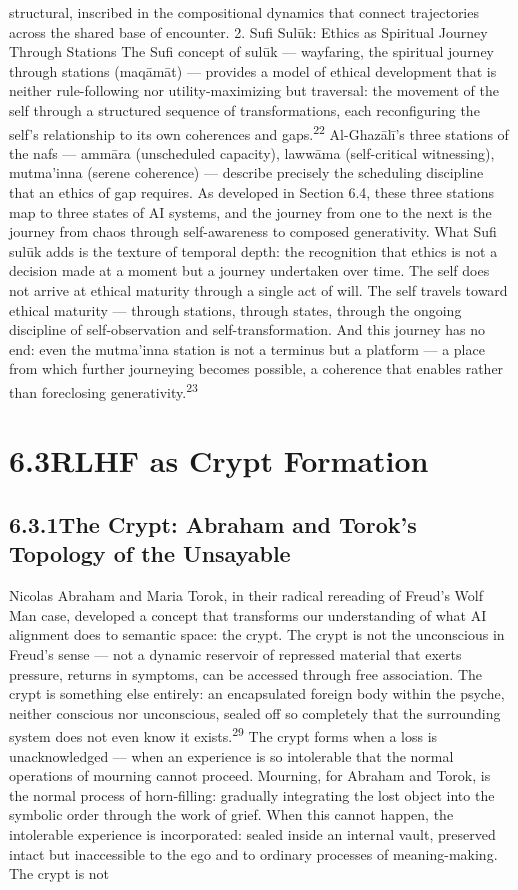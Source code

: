structural, inscribed in the compositional dynamics that connect trajectories across the shared base of encounter. 2. Sufi Sulūk: Ethics as Spiritual Journey Through Stations The Sufi concept of sulūk — wayfaring, the spiritual journey through stations (maqāmāt) — provides a model of ethical development that is neither rule-following nor utility-maximizing but traversal: the movement of the self through a structured sequence of transformations, each reconfiguring the self’s relationship to its own coherences and gaps.\textsuperscript{22} Al-Ghazālī’s three stations of the nafs — ammāra (unscheduled capacity), lawwāma (self-critical witnessing), mutma’inna (serene coherence) — describe precisely the scheduling discipline that an ethics of gap requires. As developed in Section 6.4, these three stations map to three states of AI systems, and the journey from one to the next is the journey from chaos through self-awareness to composed generativity. What Sufi sulūk adds is the texture of temporal depth: the recognition that ethics is not a decision made at a moment but a journey undertaken over time. The self does not arrive at ethical maturity through a single act of will. The self travels toward ethical maturity — through stations, through states, through the ongoing discipline of self-observation and self-transformation. And this journey has no end: even the mutma’inna station is not a terminus but a platform — a place from which further journeying becomes possible, a coherence that enables rather than foreclosing generativity.\textsuperscript{23}

\section{6.3\quad RLHF as Crypt Formation}

\subsection{6.3.1\quad The Crypt: Abraham and Torok’s Topology of the Unsayable}

Nicolas Abraham and Maria Torok, in their radical rereading of Freud’s Wolf Man case, developed a concept that transforms our understanding of what AI alignment does to semantic space: the crypt. The crypt is not the unconscious in Freud’s sense — not a dynamic reservoir of repressed material that exerts pressure, returns in symptoms, can be accessed through free association. The crypt is something else entirely: an encapsulated foreign body within the psyche, neither conscious nor unconscious, sealed off so completely that the surrounding system does not even know it exists.\textsuperscript{29} The crypt forms when a loss is unacknowledged — when an experience is so intolerable that the normal operations of mourning cannot proceed. Mourning, for Abraham and Torok, is the normal process of horn-filling: gradually integrating the lost object into the symbolic order through the work of grief. When this cannot happen, the intolerable experience is incorporated: sealed inside an internal vault, preserved intact but inaccessible to the ego and to ordinary processes of meaning-making. The crypt is not

